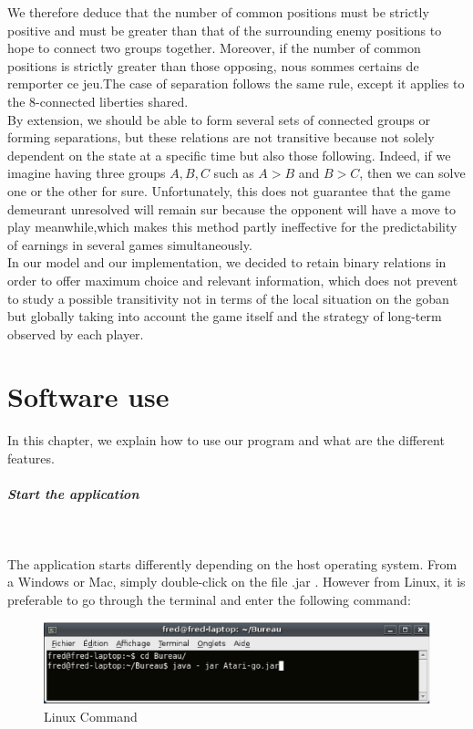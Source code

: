 \documentclass[a4paper,10pt,twoside]{report}
\begin{document}
	We therefore deduce that the number of common positions must be strictly positive and must be greater than that of the surrounding enemy positions to hope to connect two groups together. Moreover, if the number of common positions is strictly greater than those opposing, nous sommes certains de remporter ce jeu.The case of separation follows the same rule, except it applies to the 8-connected liberties shared.\\

	By extension, we should be able to form several sets of connected groups or forming separations, but these relations are not transitive because not solely dependent on the state at a specific time but also those following. Indeed, if we imagine having three groups $A, B, C$ such as $A > B$ and $B > C$, then we can solve one or the other for sure. Unfortunately, this does not guarantee that the game demeurant unresolved will remain sur because the opponent will have a move to play meanwhile,which makes this method partly ineffective for the predictability of earnings in several games simultaneously. \\

	In our model and our implementation, we decided to retain binary relations in order to offer maximum choice and relevant information, which does not prevent to study a possible transitivity not in terms of the local situation on the goban but globally taking into account the game itself and the strategy of long-term observed by each player.


\chapter{Software use}

In this chapter, we explain how to use our program and what are the different features.


        \paragraph{Start the application}
        ~~\vspace{2mm}

The application starts differently depending on the host operating system. From a Windows or Mac, simply double-click on the file .jar . However from Linux, it is preferable to go through the terminal and enter the following command:

        \begin{figure}[htbp!]
                \includegraphics[width=17.5cm]{terminal.eps}
                \caption{Linux Command}
                \label{fig:command}
        \end{figure}
\end{document}
